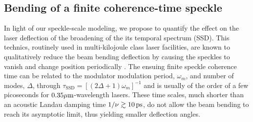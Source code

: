 \documentclass[%
 reprint,
 amsmath,amssymb,
 aps,
]{revtex4-1}
\begin{document}
\subsection{Bending of a finite coherence-time speckle} \label{sec:speckle}
In light of our speckle-scale modeling, we propose to  quantify the effect on the laser deflection of
the broadening of the its temporal spectrum (SSD).
This technics, routinely used in multi-kilojoule class laser facilities, are  known to  qualitatively  reduce  the beam bending deflection   \cite{POP_Delamater_2000} by   causing the speckles to vanish and change position periodically \cite[]{phd-Duluc,POP_Duluc_2019}.
The ensuing finite speckle coherence time can be 
related to the modulator modulation period, $\omega_m$,  and  number of modes, $\Delta $,  through $\tau_\mathrm{SSD}=[(2\Delta+1)\omega_m]^{-1}$ \cite[]{Skupski_1989} and is usually of the order of a few picoseconds for $0.35\rm\mu m$-wavelength lasers. 
These time scales, much shorter than an acoustic Landau damping time $1/\nu \gtrsim 10\,\rm ps$, do not allow the beam bending to reach its asymptotic limit, thus yielding smaller deflection angles.
\end{document}
